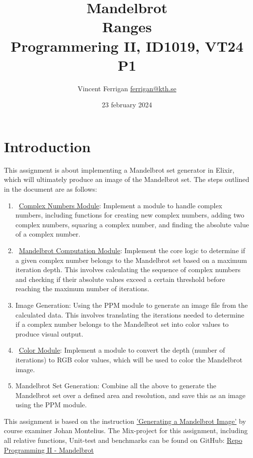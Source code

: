 \documentclass[a4paper,11pt]{article}
\begin{document}
\title{
    Mandelbrot
    \\Ranges
\\\small{Programmering II, ID1019, VT24 P1}
}
\author{Vincent Ferrigan \href{mailto:ferrigan@kth.se}{ferrigan@kth.se}}

\date{23 february 2024}
\maketitle

\section*{Introduction}
\label{sec:introduction}
This assignment is about implementing a Mandelbrot set generator in
Elixir, which will ultimately produce an image of the Mandelbrot set. 
The steps outlined in the document are as follows:
\begin{enumerate}
    \item~\hyperref[subsec:cmplx]{Complex Numbers Module}: Implement a module to handle complex numbers,
    including functions for creating new complex numbers, adding two complex
    numbers, squaring a complex number, and finding the absolute value of a
    complex number.
    \item~\hyperref[subsec:brot]{Mandelbrot Computation Module}: Implement the core logic to determine
    if a given complex number belongs to the Mandelbrot set based on a maximum
    iteration depth.
    This involves calculating the sequence of complex numbers
    and checking if their absolute values exceed a certain threshold before
    reaching the maximum number of iterations.
    \item Image Generation: Using the PPM module to generate an image file from
    the calculated data.
    This involves translating the iterations needed to
    determine if a complex number belongs to the Mandelbrot set into color
    values to produce visual output.
    \item~\hyperref[subsec:color]{Color Module}: Implement a module to convert the depth (number of
    iterations) to RGB color values, which will be used to color the Mandelbrot
    image.
    \item Mandelbrot Set Generation: Combine all the above to generate the
    Mandelbrot set over a defined area and resolution, and save this as an image
    using the PPM module.
\end{enumerate}
This assignment is based on the instruction
\href{https://people.kth.se/~johanmon/courses/id1019/seminars/mandel/mandel.pdf}{'Generating a Mandelbrot Image'}
by course examiner Johan Montelius.
The Mix-project for this assignment, including all relative functions, Unit-test and benchmarks can be found on GitHub:
\href{https://github.com/VincentFerrigan/kth-id1019-programming-ii/tree/main/tasks/7/mandelbrot}{Repo Programming II - Mandelbrot}%
\end{document}
